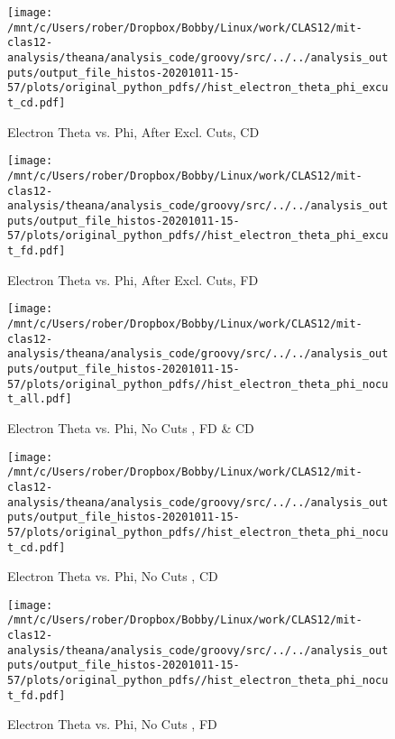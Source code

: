 \documentclass{article}
\begin{document}
\begin{landscape}
\begin{figure}[h]
        \texttt{[image: /mnt/c/Users/rober/Dropbox/Bobby/Linux/work/CLAS12/mit-clas12-analysis/theana/analysis\_code/groovy/src/../../analysis\_outputs/output\_file\_histos-20201011-15-57/plots/original\_python\_pdfs//hist\_electron\_theta\_phi\_excut\_cd.pdf]}
        \captionsetup{textformat=empty,labelformat=blank}
        \caption{Electron Theta vs. Phi, After Excl. Cuts, CD}
    \end{figure}
    \clearpage
    
    \begin{figure}[h]
        \centering

        \texttt{[image: /mnt/c/Users/rober/Dropbox/Bobby/Linux/work/CLAS12/mit-clas12-analysis/theana/analysis\_code/groovy/src/../../analysis\_outputs/output\_file\_histos-20201011-15-57/plots/original\_python\_pdfs//hist\_electron\_theta\_phi\_excut\_fd.pdf]}
        \captionsetup{textformat=empty,labelformat=blank}
        \caption{Electron Theta vs. Phi, After Excl. Cuts, FD}
    \end{figure}
    \clearpage
    
    \begin{figure}[h]
        \centering

        \texttt{[image: /mnt/c/Users/rober/Dropbox/Bobby/Linux/work/CLAS12/mit-clas12-analysis/theana/analysis\_code/groovy/src/../../analysis\_outputs/output\_file\_histos-20201011-15-57/plots/original\_python\_pdfs//hist\_electron\_theta\_phi\_nocut\_all.pdf]}
        \captionsetup{textformat=empty,labelformat=blank}
        \caption{Electron Theta vs. Phi, No Cuts , FD \& CD}
    \end{figure}
    \clearpage
    
    \begin{figure}[h]
        \centering

        \texttt{[image: /mnt/c/Users/rober/Dropbox/Bobby/Linux/work/CLAS12/mit-clas12-analysis/theana/analysis\_code/groovy/src/../../analysis\_outputs/output\_file\_histos-20201011-15-57/plots/original\_python\_pdfs//hist\_electron\_theta\_phi\_nocut\_cd.pdf]}
        \captionsetup{textformat=empty,labelformat=blank}
        \caption{Electron Theta vs. Phi, No Cuts , CD}
    \end{figure}
    \clearpage
    
    \begin{figure}[h]
        \centering

        \texttt{[image: /mnt/c/Users/rober/Dropbox/Bobby/Linux/work/CLAS12/mit-clas12-analysis/theana/analysis\_code/groovy/src/../../analysis\_outputs/output\_file\_histos-20201011-15-57/plots/original\_python\_pdfs//hist\_electron\_theta\_phi\_nocut\_fd.pdf]}
        \captionsetup{textformat=empty,labelformat=blank}
        \caption{Electron Theta vs. Phi, No Cuts , FD}
    \end{figure}
    \clearpage
    

\end{landscape}
\end{document}
